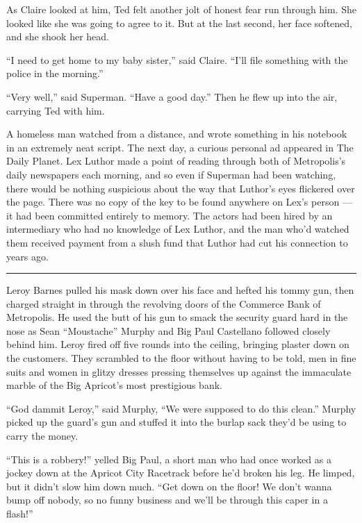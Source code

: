 As Claire looked at him, Ted felt another jolt of honest fear run
through him. She looked like she was going to agree to it. But at the
last second, her face softened, and she shook her head.

``I need to get home to my baby sister,'' said Claire. ``I'll file
something with the police in the morning.''

``Very well,'' said Superman. ``Have a good day.'' Then he flew up into
the air, carrying Ted with him.

A homeless man watched from a distance, and wrote something in his
notebook in an extremely neat script. The next day, a curious personal
ad appeared in The Daily Planet. Lex Luthor made a point of reading
through both of Metropolis's daily newspapers each morning, and so even
if Superman had been watching, there would be nothing suspicious about
the way that Luthor's eyes flickered over the page. There was no copy of
the key to be found anywhere on Lex's person --- it had been committed
entirely to memory. The actors had been hired by an intermediary who had
no knowledge of Lex Luthor, and the man who'd watched them received
payment from a slush fund that Luthor had cut his connection to years
ago.

\begin{center}\rule{0.5\linewidth}{0.5pt}\end{center}

Leroy Barnes pulled his mask down over his face and hefted his tommy
gun, then charged straight in through the revolving doors of the
Commerce Bank of Metropolis. He used the butt of his gun to smack the
security guard hard in the nose as Sean ``Moustache'' Murphy and Big
Paul Castellano followed closely behind him. Leroy fired off five rounds
into the ceiling, bringing plaster down on the customers. They scrambled
to the floor without having to be told, men in fine suits and women in
glitzy dresses pressing themselves up against the immaculate marble of
the Big Apricot's most prestigious bank.

``God dammit Leroy,'' said Murphy, ``We were supposed to do this
clean.'' Murphy picked up the guard's gun and stuffed it into the burlap
sack they'd be using to carry the money.

``This is a robbery!'' yelled Big Paul, a short man who had once worked
as a jockey down at the Apricot City Racetrack before he'd broken his
leg. He limped, but it didn't slow him down much. ``Get down on the
floor! We don't wanna bump off nobody, so no funny business and we'll be
through this caper in a flash!''

